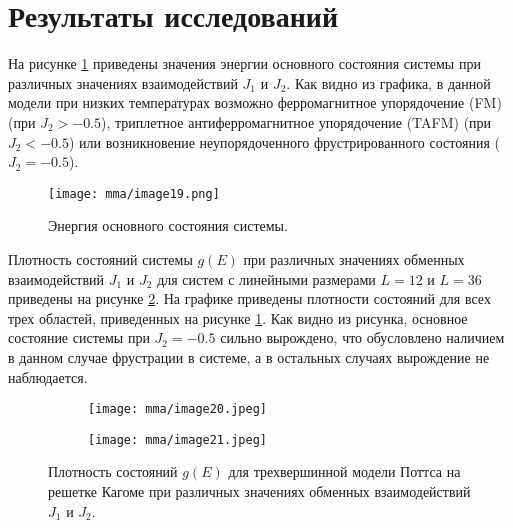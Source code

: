 \section{Результаты исследований}

На рисунке \ref{mma-fig-2} приведены значения энергии основного состояния системы при различных значениях взаимодействий $J_1$ и $J_2$. Как видно из графика, в данной модели при низких температурах возможно ферромагнитное упорядочение (FM) (при $J_2 > -0.5$), триплетное антиферромагнитное упорядочение (TAFM) (при $J_2 < -0.5$) или возникновение неупорядоченного фрустрированного состояния ($J_2 = -0.5$).
\begin{figure}[h]
    \begin{center}
        \texttt{[image: mma/image19.png]}
    \end{center}
    \caption{Энергия основного состояния системы.}
    \label{mma-fig-2}
\end{figure}

Плотность состояний системы $g(E)$ при различных значениях обменных взаимодействий $J_1$ и $J_2$ для систем с линейными размерами $L = 12$ и $L = 36$ приведены на рисунке \ref{mma-fig-3}. На графике приведены плотности состояний для всех трех областей, приведенных на рисунке \ref{mma-fig-2}. Как видно из рисунка, основное состояние системы при $J_2 = -0.5$ сильно вырождено, что обусловлено наличием в данном случае фрустрации в системе, а в остальных случаях вырождение не наблюдается.
\begin{figure}[h]
    \begin{center}
        \begin{subfigure}{0.48\textwidth}
            \begin{center}
                \texttt{[image: mma/image20.jpeg]}
            \end{center}
        \end{subfigure}
        \begin{subfigure}{0.48\textwidth}
            \begin{center}
                \texttt{[image: mma/image21.jpeg]}
            \end{center}
        \end{subfigure}
    \end{center}
    \caption{Плотность состояний $g(E)$ для трехвершинной модели Поттса на решетке Кагоме при различных значениях обменных взаимодействий $J_1$ и $J_2$.}
    \label{mma-fig-3}
\end{figure}

